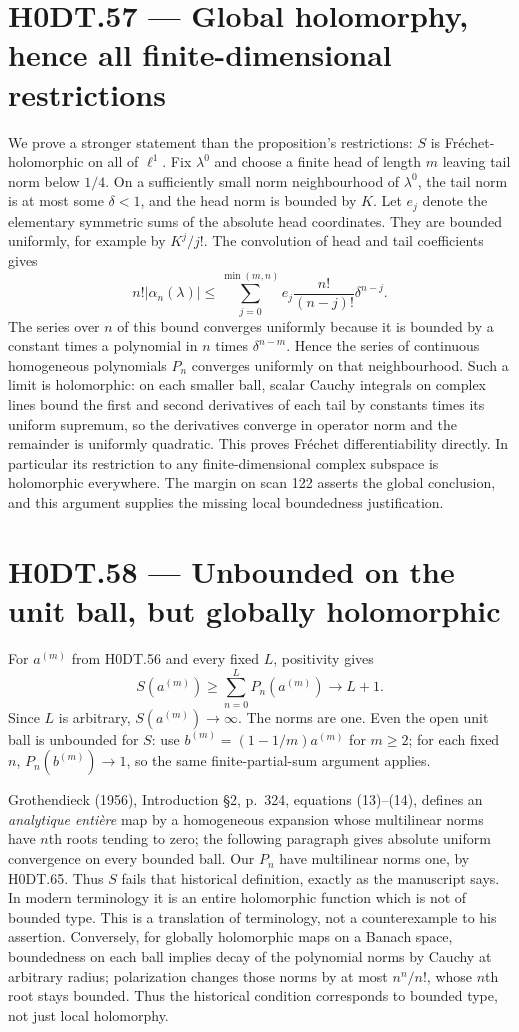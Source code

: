 \section*{H0DT.57 --- Global holomorphy, hence all finite-dimensional restrictions}
We prove a stronger statement than the proposition's restrictions: $S$ is Fr\'echet-holomorphic on all of $\ell^1$. Fix $\lambda^0$ and choose a finite head of length $m$ leaving tail norm below $1/4$. On a sufficiently small norm neighbourhood of $\lambda^0$, the tail norm is at most some $\delta<1$, and the head norm is bounded by $K$. Let $e_j$ denote the elementary symmetric sums of the absolute head coordinates. They are bounded uniformly, for example by $K^j/j!$. The convolution of head and tail coefficients gives
\[
 n!|\alpha_n(\lambda)|\le
 \sum_{j=0}^{\min(m,n)} e_j\frac{n!}{(n-j)!}\delta^{n-j}.
\]
The series over $n$ of this bound converges uniformly because it is bounded by a constant times a polynomial in $n$ times $\delta^{n-m}$. Hence the series of continuous homogeneous polynomials $P_n$ converges uniformly on that neighbourhood. Such a limit is holomorphic: on each smaller ball, scalar Cauchy integrals on complex lines bound the first and second derivatives of each tail by constants times its uniform supremum, so the derivatives converge in operator norm and the remainder is uniformly quadratic. This proves Fr\'echet differentiability directly. In particular its restriction to any finite-dimensional complex subspace is holomorphic everywhere. The margin on scan 122 asserts the global conclusion, and this argument supplies the missing local boundedness justification.

\section*{H0DT.58 --- Unbounded on the unit ball, but globally holomorphic}
For $a^{(m)}$ from H0DT.56 and every fixed $L$, positivity gives
\[
 S(a^{(m)})\ge\sum_{n=0}^L P_n(a^{(m)})\longrightarrow L+1.
\]
Since $L$ is arbitrary, $S(a^{(m)})\to\infty$. The norms are one. Even the open unit ball is unbounded for $S$: use $b^{(m)}=(1-1/m)a^{(m)}$ for $m\ge2$; for each fixed $n$, $P_n(b^{(m)})\to1$, so the same finite-partial-sum argument applies.

Grothendieck (1956), Introduction \S2, p.~324, equations (13)--(14), defines an \emph{analytique enti\`ere} map by a homogeneous expansion whose multilinear norms have $n$th roots tending to zero; the following paragraph gives absolute uniform convergence on every bounded ball. Our $P_n$ have multilinear norms one, by H0DT.65. Thus $S$ fails that historical definition, exactly as the manuscript says. In modern terminology it is an entire holomorphic function which is not of bounded type. This is a translation of terminology, not a counterexample to his assertion. Conversely, for globally holomorphic maps on a Banach space, boundedness on each ball implies decay of the polynomial norms by Cauchy at arbitrary radius; polarization changes those norms by at most $n^n/n!$, whose $n$th root stays bounded. Thus the historical condition corresponds to bounded type, not just local holomorphy.

